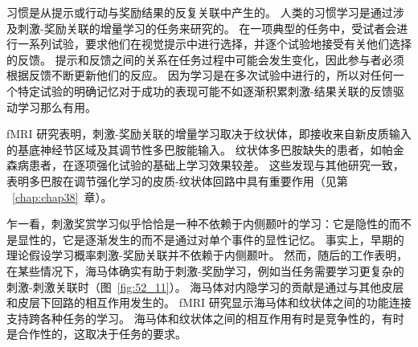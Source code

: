 习惯是从提示或行动与奖励结果的反复关联中产生的。
人类的习惯学习是通过涉及刺激-奖励关联的增量学习的任务来研究的。
在一项典型的任务中，受试者会进行一系列试验，要求他们在视觉提示中进行选择，并逐个试验地接受有关他们选择的反馈。
提示和反馈之间的关系在任务过程中可能会发生变化，因此参与者必须根据反馈不断更新他们的反应。
因为学习是在多次试验中进行的，所以对任何一个特定试验的明确记忆对于成功的表现可能不如逐渐积累刺激-结果关联的反馈驱动学习那么有用。


fMRI 研究表明，刺激-奖励关联的增量学习取决于纹状体，即接收来自新皮质输入的基底神经节区域及其调节性多巴胺能输入。
纹状体多巴胺缺失的患者，如帕金森病患者，在逐项强化试验的基础上学习效果较差。
这些发现与其他研究一致，表明多巴胺在调节强化学习的皮质-纹状体回路中具有重要作用（见第 ~\ref{chap:chap38}~章）。


乍一看，刺激奖赏学习似乎恰恰是一种不依赖于内侧颞叶的学习：它是隐性的而不是显性的，它是逐渐发生的而不是通过对单个事件的显性记忆。
事实上，早期的理论假设学习概率刺激-奖励关联并不依赖于内侧颞叶。
然而，随后的工作表明，在某些情况下，海马体确实有助于刺激-奖励学习，例如当任务需要学习更复杂的刺激-刺激关联时（图~\ref{fig:52_11}）。
海马体对内隐学习的贡献是通过与其他皮层和皮层下回路的相互作用发生的。
fMRI 研究显示海马体和纹状体之间的功能连接支持跨各种任务的学习。
海马体和纹状体之间的相互作用有时是竞争性的，有时是合作性的，这取决于任务的要求。


